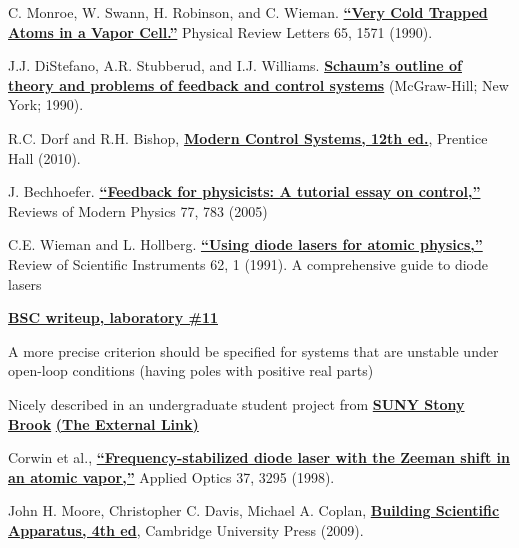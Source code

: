 \documentclass{../lab}
\begin{document}
\begin{thebibliography}{}
     C. Monroe, W. Swann, H. Robinson, and C. Wieman. \href{http://physics111.lib.berkeley.edu/Physics111/Reprints/MOT/Very\%20Cold\%20Trapped\%20Atoms\%20in\%20a\%20Vapor\%20Cell_PhysRevLett.65.1571.pdf}{\textbf{``Very Cold Trapped Atoms in a Vapor Cell.''}} Physical Review Letters 65, 1571 (1990).

     J.J. DiStefano, A.R. Stubberud, and I.J. Williams. \href{http://physics111.lib.berkeley.edu/Physics111/Reprints/MOT/Schaum's\%20Outline\%20Theory\%20and\%20Problems\%20of\%20Feedback\%20and\%20Control\%20Systems/}{\textbf{Schaum’s outline of theory and problems of feedback and control systems}} (McGraw-Hill; New York; 1990).

     R.C. Dorf and R.H. Bishop, \href{http://physics111.lib.berkeley.edu/Physics111/Reprints/MOT/Richard\%20C.\%20Dorf,\%20Robert\%20H.\%20Bishop\%20Modern\%20Control\%20Systems.pdf}{\textbf{Modern Control Systems, 12th ed.}}, Prentice Hall (2010).

     J. Bechhoefer. \href{http://physics111.lib.berkeley.edu/Physics111/Reprints/MOT/Bechhoefer_RMP_v77-2005-p783_1.pdf}{\textbf{``Feedback for physicists: A tutorial essay on control,''}} Reviews of Modern Physics 77, 783 (2005)

     C.E. Wieman and L. Hollberg. \href{http://physics111.lib.berkeley.edu/Physics111/Reprints/MOT/usingdiodelasersforatomicphysics.pdf}{\textbf{``Using diode lasers for atomic physics,''}} Review of Scientific Instruments 62, 1 (1991). A comprehensive guide to diode lasers

     \href{http://socrates.berkeley.edu/~phylabs/bsc/PDFFiles/bscLV-11.pdf}{\textbf{BSC writeup, laboratory \#11}}

     A more precise criterion should be specified for systems that are unstable under open-loop conditions (having poles with positive real parts)

     Nicely described in an undergraduate student project from \href{http://experimentationlab.berkeley.edu/sites/default/files/Mini-Project\%20Report.pdf}{\textbf{SUNY Stony Brook}} \href{http://laser.physics.sunysb.edu/~simone/mini-project/}{\textbf{(The External Link)}}

     Corwin et al., \href{http://physics111.lib.berkeley.edu/Physics111/Reprints/MOT/Frequency-stabilized\%20diode\%20laser\%20with\%20the\%20Zeeman\%20shift\%20in\%20an\%20atomic\%20vapor\%20ao-37-15-3295.pdf}{\textbf{``Frequency-stabilized diode laser with the Zeeman shift in an atomic vapor,''}} Applied Optics 37, 3295 (1998).

     John H. Moore, Christopher C. Davis, Michael A. Coplan, \href{http://physics111.lib.berkeley.edu/Physics111/Reprints/MOT/John\%20Moore,\%20Christopher\%20Davis,\%20Michael\%20A.\%20Coplan_Building\%20Scientific\%20Apparatus,\%204th\%20ed.pdf}{\textbf{Building Scientific Apparatus, 4th ed}}, Cambridge University Press (2009).
\end{thebibliography}
\end{document}
